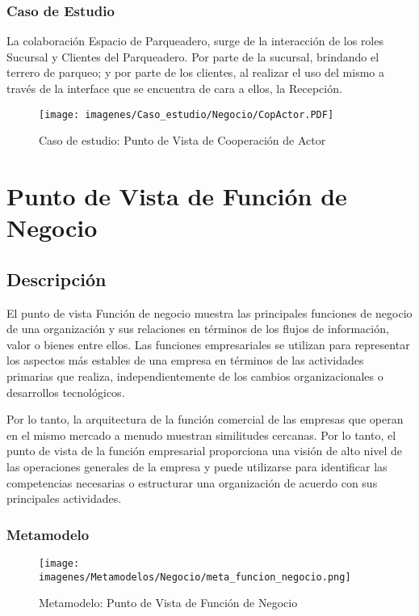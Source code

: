 \subsubsection{Caso de Estudio}
La colaboración Espacio de Parqueadero, surge de la interacción de los roles Sucursal y Clientes del Parqueadero. Por parte de la sucursal, brindando el terrero de parqueo; y por parte de los clientes, al realizar el uso del mismo a través de la interface que se encuentra de cara a ellos, la Recepción.
\begin{figure}[h]
	\centering
	\texttt{[image: imagenes/Caso\_estudio/Negocio/CopActor.PDF]}
	\caption{Caso de estudio: Punto de Vista de Cooperación de Actor}
	\label{fig:gap_analysis}
\end{figure}










\section{Punto de Vista de Función de Negocio}
\subsection{Descripción}
El punto de vista Función de negocio muestra las principales funciones de negocio de una organización y sus relaciones en términos de los flujos de información, valor o bienes entre ellos. Las funciones empresariales se utilizan para representar los aspectos más estables de una empresa en términos de las actividades primarias que realiza, independientemente de los cambios organizacionales o desarrollos tecnológicos.

Por lo tanto, la arquitectura de la función comercial de las empresas que operan en el mismo mercado a menudo muestran similitudes cercanas. Por lo tanto, el punto de vista de la función empresarial proporciona una visión de alto nivel de las operaciones generales de la empresa y puede utilizarse para identificar las competencias necesarias o estructurar una organización de acuerdo con sus principales actividades.


\subsubsection{Metamodelo}
\begin{figure}[h]
	\centering
	\texttt{[image: imagenes/Metamodelos/Negocio/meta\_funcion\_negocio.png]}
	\caption{Metamodelo: Punto de Vista de Función de Negocio}
	\label{fig:gap_analysis}
\end{figure}



